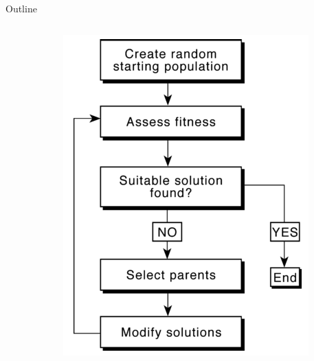 \documentclass[10pt]{beamer}
\begin{document}
{\begin{frame}{Outline}
\begin{columns}[c]
\begin{column}{.48\textwidth}
		\end{column}
		\hfill
		\begin{column}{0.48\textwidth}
			\begin{figure}
			\includegraphics[width=0.8\linewidth]{images/GA_outline_Carwright.PNG}
			\end{figure}
		\end{column}	
	\end{columns}
\end{frame}
}
\end{document}
